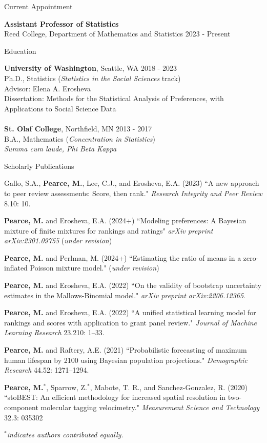 \documentclass{resume} %
\begin{document}
\begin{rSection}{Current Appointment}

\textbf{Assistant Professor of Statistics}
\\ Reed College, Department of Mathematics and Statistics \hfill{2023 - Present}
\end{rSection}

\begin{rSection}{Education}

\textbf{University of Washington}, Seattle, WA \hfill {2018 - 2023} 
\\ Ph.D., Statistics ({\it Statistics in the Social Sciences} track)
\\ Advisor: Elena A. Erosheva
\\ Dissertation: Methods for the Statistical Analysis of Preferences, with Applications to Social Science Data
\\
\\\textbf{St. Olaf College}, Northfield, MN \hfill {2013 - 2017} 
\\ B.A., Mathematics ({\it Concentration in Statistics})
\\ {\it Summa cum laude, Phi Beta Kappa}
\end{rSection}


\begin{rSection}{Scholarly Publications}

Gallo, S.A., \textbf{Pearce, M.}, Lee, C.J., and Erosheva, E.A. (2023) ``A new approach to peer review assessments: Score, then rank." \textit{Research Integrity and Peer Review} 8.10: 10.

\textbf{Pearce, M.} and Erosheva, E.A. (2024+) ``Modeling preferences: A Bayesian mixture of finite mixtures for rankings and ratings" \textit{arXiv preprint arXiv:2301.09755} (\textit{under revision})

\textbf{Pearce, M.} and Perlman, M. (2024+) ``Estimating the ratio of means in a zero-inflated Poisson mixture model." (\textit{under revision})

\textbf{Pearce, M.} and Erosheva, E.A. (2022) ``On the validity of bootstrap uncertainty estimates in the Mallows-Binomial model." \textit{arXiv preprint arXiv:2206.12365}.

\textbf{Pearce, M.} and Erosheva, E.A. (2022) ``A unified statistical learning model for rankings and scores with application to grant panel review." \textit{Journal of Machine Learning Research} 23.210: 1--33.

\textbf{Pearce, M.} and Raftery, A.E. (2021) ``Probabilistic forecasting of maximum human lifespan by 2100 using Bayesian population projections." {\em Demographic Research} 44.52: 1271--1294.

\textbf{Pearce, M.}$^*$, Sparrow, Z.$^*$, Mabote, T. R., and Sanchez-Gonzalez, R. (2020) ``stoBEST: An efficient methodology for increased spatial resolution in two-component molecular tagging velocimetry." {\em Measurement Science and Technology} 32.3: 035302

{\em $^*$indicates authors contributed equally.}
\end{rSection}
\end{document}
